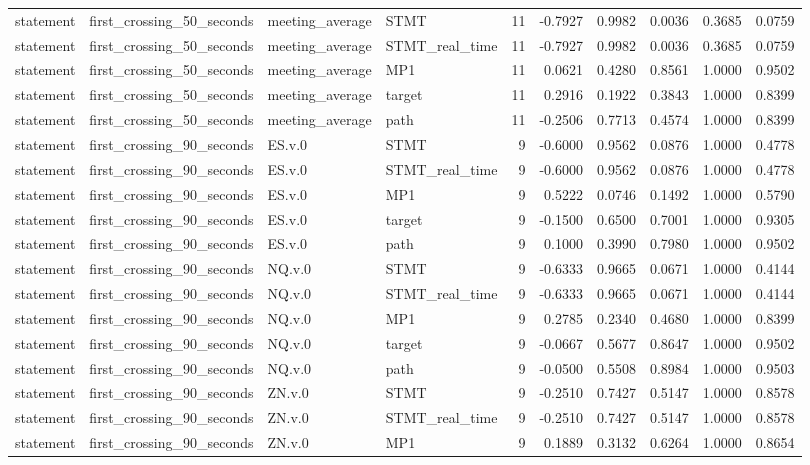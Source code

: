 \begin{tabular}{llllrrrrrr}
statement & first_crossing_50_seconds & meeting_average & STMT & 11 & -0.7927 & 0.9982 & 0.0036 & 0.3685 & 0.0759 \\
statement & first_crossing_50_seconds & meeting_average & STMT_real_time & 11 & -0.7927 & 0.9982 & 0.0036 & 0.3685 & 0.0759 \\
statement & first_crossing_50_seconds & meeting_average & MP1 & 11 & 0.0621 & 0.4280 & 0.8561 & 1.0000 & 0.9502 \\
statement & first_crossing_50_seconds & meeting_average & target & 11 & 0.2916 & 0.1922 & 0.3843 & 1.0000 & 0.8399 \\
statement & first_crossing_50_seconds & meeting_average & path & 11 & -0.2506 & 0.7713 & 0.4574 & 1.0000 & 0.8399 \\
statement & first_crossing_90_seconds & ES.v.0 & STMT & 9 & -0.6000 & 0.9562 & 0.0876 & 1.0000 & 0.4778 \\
statement & first_crossing_90_seconds & ES.v.0 & STMT_real_time & 9 & -0.6000 & 0.9562 & 0.0876 & 1.0000 & 0.4778 \\
statement & first_crossing_90_seconds & ES.v.0 & MP1 & 9 & 0.5222 & 0.0746 & 0.1492 & 1.0000 & 0.5790 \\
statement & first_crossing_90_seconds & ES.v.0 & target & 9 & -0.1500 & 0.6500 & 0.7001 & 1.0000 & 0.9305 \\
statement & first_crossing_90_seconds & ES.v.0 & path & 9 & 0.1000 & 0.3990 & 0.7980 & 1.0000 & 0.9502 \\
statement & first_crossing_90_seconds & NQ.v.0 & STMT & 9 & -0.6333 & 0.9665 & 0.0671 & 1.0000 & 0.4144 \\
statement & first_crossing_90_seconds & NQ.v.0 & STMT_real_time & 9 & -0.6333 & 0.9665 & 0.0671 & 1.0000 & 0.4144 \\
statement & first_crossing_90_seconds & NQ.v.0 & MP1 & 9 & 0.2785 & 0.2340 & 0.4680 & 1.0000 & 0.8399 \\
statement & first_crossing_90_seconds & NQ.v.0 & target & 9 & -0.0667 & 0.5677 & 0.8647 & 1.0000 & 0.9502 \\
statement & first_crossing_90_seconds & NQ.v.0 & path & 9 & -0.0500 & 0.5508 & 0.8984 & 1.0000 & 0.9503 \\
statement & first_crossing_90_seconds & ZN.v.0 & STMT & 9 & -0.2510 & 0.7427 & 0.5147 & 1.0000 & 0.8578 \\
statement & first_crossing_90_seconds & ZN.v.0 & STMT_real_time & 9 & -0.2510 & 0.7427 & 0.5147 & 1.0000 & 0.8578 \\
statement & first_crossing_90_seconds & ZN.v.0 & MP1 & 9 & 0.1889 & 0.3132 & 0.6264 & 1.0000 & 0.8654 \\

\end{tabular}
